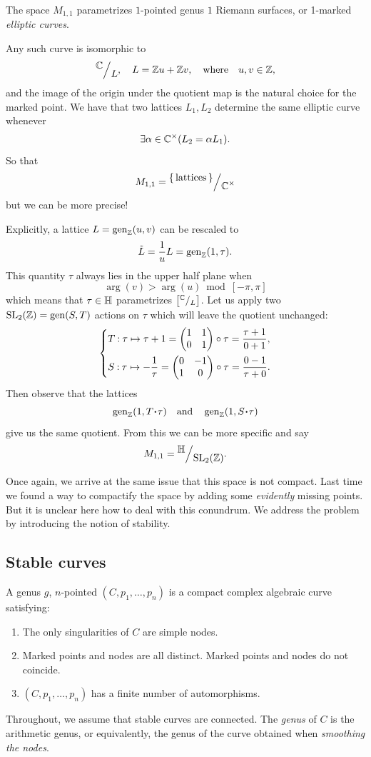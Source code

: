 \documentclass[12pt]{memoir}
\begin{document}
\begin{Ex}
    The space $M_{1,1}$ parametrizes $1$-pointed genus $1$ Riemann surfaces, or 1-marked \emph{elliptic curves}.\par
    Any such curve is isomorphic to 
    $$\quot{\bC}{L},\quad L=\bZ u+\bZ v,\word{where}u,v\in\bZ,$$
    and the image of the origin under the quotient map is the natural choice for the marked point. We have that two lattices $L_1,L_2$ determine the same elliptic curve whenever 
    $$\exists \alpha\in\mathbb{C}^\times(L_2=\alpha L_1).$$
    So that 
    $$M_{1,1}=\quot{\set{\text{lattices}}}{\bC^\x}$$
    but we can be more precise!\par
    Explicitly, a lattice $L=\operatorname{gen}_{\mathbb{Z}}(u,v)$ can be rescaled to
    $$\tilde{L}=\frac{1}{u}L=\operatorname{gen}_{\mathbb{Z}}(1,\tau).$$
    This quantity $\tau$ always lies in the upper half plane when 
    $$\arg(v)>\arg(u)\bmod[-\pi,\pi]$$
    which means that $\tau\in\mathbb{H}$ parametrizes $\bonj{\quot{\bC}{L}}$. 
    Let us apply two $\mathrm{SL}_2(\mathbb{Z})=\operatorname{gen}(S,T)$ actions on $\tau$ which will leave the quotient unchanged:
    $$
    \left\lbrace
    \begin{aligned}
        &T\mathbin{:}\tau\mapsto\tau+1=\begin{pmatrix} 1 & 1 \\ 0 & 1 \end{pmatrix}\circ\tau=\frac{\tau+1}{0+1},\\
        &S\mathbin{:}\tau\mapsto-\frac1\tau=\begin{pmatrix} 0 & -1 \\ 1 & 0 \end{pmatrix}\circ\tau=\frac{0-1}{\tau+0}.
    \end{aligned}
    \right.
    $$
    Then observe that the lattices
    $$\gen_\bZ(1,T\.\tau)\word{and}\gen_\bZ(1,S\.\tau)$$
    give us the same quotient. From this we can be more specific and say 
    $$M_{1,1}=\quot{\bH}{\rSL_2(\bZ)}.$$
\end{Ex}

Once again, we arrive at the same issue that this space is not compact. Last time we found a way to compactify the space by adding some \emph{evidently} missing points. But it is unclear here how to deal with this conundrum. We address the problem by introducing the notion of stability.

\subsection{Stable curves}

\begin{Def}
    A genus $g$, $n$-pointed  $(C,p_1,\dots,p_n)$ is a compact complex algebraic curve satisfying:
    \begin{enumerate}
        \item The only singularities of $C$ are simple nodes.
        \item Marked points and nodes are all distinct. Marked points and nodes do not coincide.
        \item\label{fin-number-auts} $(C,p_1,\dots,p_n)$ has a finite number of automorphisms.
    \end{enumerate}
    Throughout, we assume that stable curves are connected. The \emph{genus} of $C$ is the arithmetic genus, or equivalently, the genus of the curve obtained when \emph{smoothing the nodes}.
\end{Def}
\end{document}

